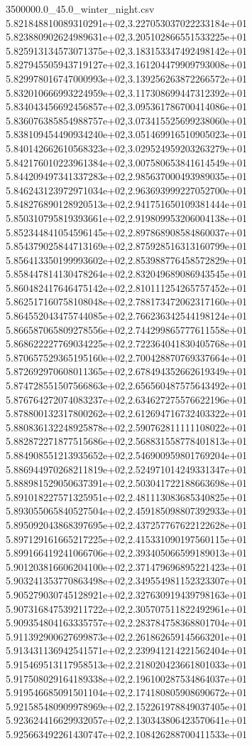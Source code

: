 \begin{filecontents*}{3500000.0_45.0_winter_night.csv}
5.821848810089310291e+02,3.227053037022233184e+01
5.823880902624989631e+02,3.205102866551533225e+01
5.825913134573071375e+02,3.183153347492498142e+01
5.827945505943719127e+02,3.161204479909793008e+01
5.829978016747000993e+02,3.139256263872266572e+01
5.832010666993224959e+02,3.117308699447312392e+01
5.834043456692456857e+02,3.095361786700414086e+01
5.836076385854988757e+02,3.073415525699238060e+01
5.838109454490934240e+02,3.051469916510905023e+01
5.840142662610568323e+02,3.029524959203263279e+01
5.842176010223961384e+02,3.007580653841614549e+01
5.844209497341337283e+02,2.985637000493989035e+01
5.846243123972971034e+02,2.963693999227052700e+01
5.848276890128920513e+02,2.941751650109381444e+01
5.850310795819393661e+02,2.919809953206004138e+01
5.852344841054596145e+02,2.897868908584860037e+01
5.854379025844713169e+02,2.875928516313160799e+01
5.856413350199993602e+02,2.853988776458572829e+01
5.858447814130478264e+02,2.832049689086943545e+01
5.860482417646475142e+02,2.810111254265757452e+01
5.862517160758108048e+02,2.788173472062317160e+01
5.864552043475744085e+02,2.766236342544198124e+01
5.866587065809278556e+02,2.744299865777611558e+01
5.868622227769034225e+02,2.722364041830405768e+01
5.870657529365195160e+02,2.700428870769337664e+01
5.872692970608011365e+02,2.678494352662619349e+01
5.874728551507566863e+02,2.656560487575643492e+01
5.876764272074083237e+02,2.634627275576622196e+01
5.878800132317800262e+02,2.612694716732403322e+01
5.880836132248925878e+02,2.590762811111108022e+01
5.882872271877515686e+02,2.568831558778401813e+01
5.884908551213935652e+02,2.546900959801769204e+01
5.886944970268211819e+02,2.524971014249331347e+01
5.888981529050637391e+02,2.503041722188663698e+01
5.891018227571325951e+02,2.481113083685340825e+01
5.893055065840527504e+02,2.459185098807392933e+01
5.895092043868397695e+02,2.437257767622122628e+01
5.897129161665217225e+02,2.415331090197560115e+01
5.899166419241066706e+02,2.393405066599189013e+01
5.901203816606204100e+02,2.371479696895221423e+01
5.903241353770863498e+02,2.349554981152323307e+01
5.905279030745128921e+02,2.327630919439798163e+01
5.907316847539211722e+02,2.305707511822492961e+01
5.909354804163335757e+02,2.283784758368801704e+01
5.911392900627699873e+02,2.261862659145663201e+01
5.913431136942541571e+02,2.239941214221562404e+01
5.915469513117958513e+02,2.218020423661801033e+01
5.917508029164189338e+02,2.196100287534864037e+01
5.919546685091501104e+02,2.174180805908690672e+01
5.921585480909978969e+02,2.152261978849037405e+01
5.923624416629932057e+02,2.130343806423570641e+01
5.925663492261430747e+02,2.108426288700411533e+01

\end{filecontents*}
